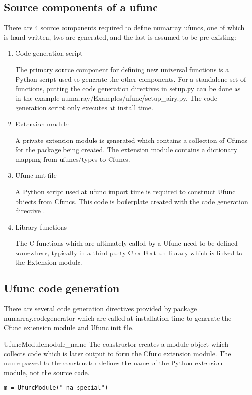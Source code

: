 \subsection{Source components of a ufunc}
There are 4 source components required to define numarray ufuncs, one of which
is hand written, two are generated, and the last is assumed to be pre-existing:

\begin {enumerate}
\item Code generation script

The primary source component for defining new universal functions is a Python
script used to generate the other components.  For a standalone set of
functions, putting the code generation directives in setup.py can be done as in
the example numarray/Examples/ufunc/setup_airy.py.  The code generation script
only executes at install time.

\item Extension module

A private extension module is generated which contains a collection of Cfuncs
for the package being created.  The extension module contains a dictionary
mapping from ufuncs/types to Cfuncs.

\item Ufunc init file 

A Python script used at ufunc import time is required to construct Ufunc
objects from Cfuncs.  This code is boilerplate created with the code generation
directive .

\item Library functions

The C functions which are ultimately called by a Ufunc need to be defined
somewhere, typically in a third party C or Fortran library which is linked
to the Extension module.
\end{enumerate}

\subsection{Ufunc code generation}
There are several code generation directives provided by package
numarray.codegenerator which are called at installation time to generate the
Cfunc extension module and Ufunc init file.

\begin{funcdesc}{UfuncModule}{module_name}
The  constructor creates a module object which collects code
which is later output to form the Cfunc extension module.  The name passed to
the constructor defines the name of the Python extension module, not the source
code.
\begin{verbatim}
m = UfuncModule("_na_special")
\end{verbatim}
\end{funcdesc}

